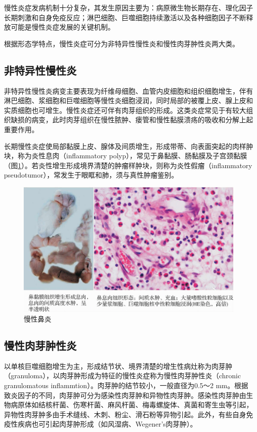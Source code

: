 慢性炎症发病机制十分复杂，其发生原因主要为：病原微生物长期存在、理化因子长期刺激和自身免疫反应；淋巴细胞、巨噬细胞持续激活以及各种细胞因子不断释放可能是慢性炎症发展的关键机制。

根据形态学特点，慢性炎症可分为非特异性慢性炎和慢性肉芽肿性炎两大类。

\subsection{非特异性慢性炎}

非特异性慢性炎病变主要表现为纤维母细胞、血管内皮细胞和组织细胞增生，伴有淋巴细胞、浆细胞和巨噬细胞等慢性炎细胞浸润，同时局部的被覆上皮、腺上皮和实质细胞也可增生。慢性炎症还可伴有肉芽组织的形成。这类炎症常见于有较大组织缺损的病变，此时肉芽组织在慢性脓肿、瘘管和慢性黏膜溃疡的吸收和分解上起重要作用。

长期慢性炎症使局部黏膜上皮、腺体及间质增生，形成带蒂、向表面突起的肉样肿块，称为炎性息肉（inflammatory
polyp），常见于鼻黏膜、肠黏膜及子宫颈黏膜（图\ref{fig4-12}）。若炎性增生形成境界清楚的肿瘤样肿块，则称为炎性假瘤（inflammatory
pseudotumor），常发生于眼眶和肺，须与真性肿瘤鉴别。

\begin{figure}[!htbp]
  \centering
  \includegraphics{./images/Image00063.jpg}
  \caption{慢性鼻炎}
  \label{fig4-12}
\end{figure}

\subsection{慢性肉芽肿性炎}

以单核巨噬细胞增生为主，形成结节状、境界清楚的增生性病灶称为肉芽肿（granuloma），以肉芽肿形成为特征的慢性炎症称为慢性肉芽肿性炎（chronic
granulomatous inflammtion）。肉芽肿的结节较小，一般直径为0.5～2
mm。根据致炎因子的不同，肉芽肿可分为感染性肉芽肿和异物性肉芽肿。感染性肉芽肿由生物病原体如结核杆菌、伤寒杆菌、麻风杆菌、梅毒螺旋体、真菌和寄生虫等引起，异物性肉芽肿多由手术缝线、木刺、粉尘、滑石粉等异物引起。此外，有些自身免疫性疾病也可引起肉芽肿形成（如风湿病、Wegener's肉芽肿）。

